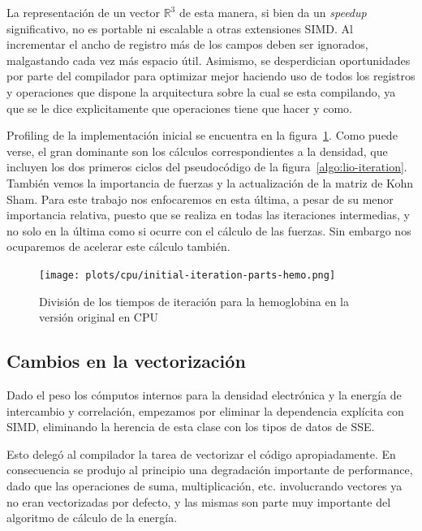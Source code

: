 La representaci\'on de un vector $\mathbb{R}^3$ de esta manera, si bien da
un \textit{speedup} significativo, no es portable ni escalable a otras extensiones
SIMD. Al incrementar el ancho de registro m\'as de los campos deben ser ignorados, malgastando cada
vez m\'as espacio \'util. Asimismo, se desperdician oportunidades por parte del compilador
para optimizar mejor haciendo uso de todos los registros y operaciones que dispone
la arquitectura sobre la cual se esta compilando, ya que se le dice explicitamente
que operaciones tiene que hacer y como.

Profiling de la implementaci\'on inicial se encuentra en la figura~\ref{fig:initial-profiling}.
Como puede verse, el gran dominante son los c\'alculos correspondientes a la densidad,
que incluyen los dos primeros ciclos del pseudoc\'odigo de
la figura~\ref{algo:lio-iteration}. Tambi\'en vemos la importancia de fuerzas y
la actualizaci\'on de la matriz de Kohn Sham. Para este trabajo nos enfocaremos
en esta \'ultima, a pesar de su menor importancia relativa, puesto que se realiza
en todas las iteraciones intermedias, y no solo en la \'ultima como si ocurre
con el c\'alculo de las fuerzas. Sin embargo nos ocuparemos de acelerar este
c\'alculo tambi\'en.

\begin{figure}[htbp]
   \centering
   \texttt{[image: plots/cpu/initial-iteration-parts-hemo.png]}
   \caption{Divisi\'on de los tiempos de iteraci\'on para la hemoglobina en la versi\'on
   original en CPU}
   \label{fig:initial-profiling}
\end{figure}

\subsection{Cambios en la vectorizaci\'on}

Dado el peso los c\'omputos internos para la densidad electr\'onica y la energ\'ia
de intercambio y correlaci\'on, empezamos por eliminar la dependencia expl\'icita
con SIMD, eliminando la herencia de esta clase con los tipos de datos de SSE.

Esto deleg\'o al compilador la tarea de vectorizar el c\'odigo apropiadamente. En consecuencia
se produjo al principio una degradaci\'on importante de performance, dado que las operaciones
de suma, multiplicaci\'on, etc. involucrando vectores ya no eran vectorizadas por defecto, y
las mismas son parte muy importante del algoritmo de c\'alculo de la energ\'ia.

